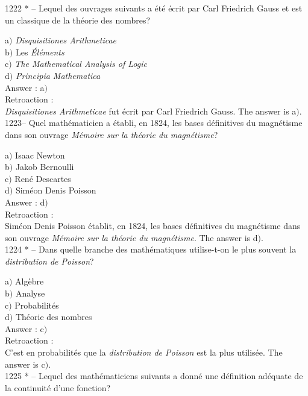 ﻿\documentclass[letterpaper, 12pt]{article}
\begin{document}
1222 * -- Lequel des ouvrages suivants a \'et\'e \'ecrit par Carl
Friedrich Gauss et est un classique de la th\'eorie des nombres?

a$)$ {\sl Disquisitiones Arithmeticae} \\
b$)$ Les {\sl \'El\'ements} \\
c$)$ {\sl The Mathematical Analysis of Logic} \\
d$)$ {\sl Principia Mathematica}\\

Answer : a$)$\\

Retroaction : \\
{\sl Disquisitiones Arithmeticae} fut \'ecrit par Carl Friedrich
Gauss.
The answer is a$)$.\\

1223-- Quel math\'ematicien a \'etabli, en 1824, les bases
d\'efinitives du magn\'etisme dans son ouvrage {\sl M\'emoire sur la
th\'eorie du magn\'etisme}?

a$)$ Isaac Newton \\
b$)$ Jakob Bernoulli \\
c$)$ Ren\'e Descartes \\
d$)$ Sim\'eon Denis Poisson\\

Answer : d$)$\\

Retroaction : \\
Sim\'eon Denis Poisson \'etablit, en 1824, les bases d\'efinitives
du magn\'etisme dans son ouvrage {\sl M\'emoire sur la th\'eorie du
magn\'etisme}.
The answer is d$)$.\\

1224 * -- Dans quelle branche des math\'ematiques utilise-t-on le
plus souvent la {\sl distribution de Poisson}?

a$)$ Alg\`ebre \\
b$)$ Analyse \\
c$)$ Probabilit\'es \\
d$)$ Th\'eorie des nombres\\

Answer : c$)$\\

Retroaction : \\
C'est en probabilit\'es que la {\sl distribution de Poisson} est la plus
utilis\'ee.
The answer is c$)$.\\

1225 * -- Lequel des math\'ematiciens suivants a donn\'e une
d\'efinition ad\'equate de la continuit\'e d'une fonction?
\end{document}

